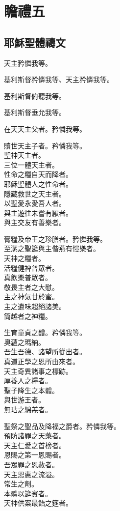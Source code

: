 \chapter[瞻禮五]{瞻禮五}
\section{耶穌聖體禱文}
\versicle 天主矜憐我等。

\Response 基利斯督矜憐我等、天主矜憐我等。

\versicle 基利斯督俯聽我等。

\Response 基利斯督垂允我等。

\versicle 在天天主父者。\hfill \response 矜憐我等。

\versicle 贖世天主子者。\hfill \response 矜憐我等。\\
聖神天主者。\\
三位一體天主者。\\
性命之糧自天而降者。\\
耶穌聖體人之性命者。\\
隱藏救世之天主者。\\
以聖愛永愛吾人者。\\
與主遊往未嘗有厭者。\\
與主交友有善樂者。

\versicle 膏糧及帝王之珍膳者。\hfill \response 矜憐我等。\\
至潔之聖筵與主偕燕有愷樂者。\\
天神之糧者。\\
活糧健裨普眾者。\\
真飲樂普眾者。\\
敬畏主者之大慰。\\
主之神氣甘於蜜。\\
主之遺味超絕諸美。\\
筒越者之神糧。

\versicle 生育童貞之醴。\hfill \response 矜憐我等。\\
奧蘊之瑪納。\\
吾生吾德、諸望所從出者。\\
真道正學之恩所由來者。\\
天主奇異諸事之標跡。\\
厚養人之糧者。\\
聖子降生之本體。\\
與世游王者。\\
無玷之綿羔者。

\versicle 聖祭之聖品及降福之爵者。\hfill \response 矜憐我等。\\
預防諸罪之天藥者。\\
天主仁愛之首榜者。\\
恩賜之第一恩賜者。\\
吾眾罪之恩赦者。\\
天主恩惠之流溢。\\
常生之劑。\\
本體以筵賓者。\\
天神供案最飴之筵者。

